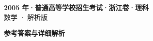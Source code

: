 \documentclass[zihao=-4, a4paper]{ctexart}
\begin{document}
\begin{center}
  {\Large\bfseries 2005 年·普通高等学校招生考试·浙江卷·理科}\\[4pt]
  {\large 数学 · 解析版}
\end{center}
\medskip
{}

\clearpage
{}
\begin{center}{\Large\bfseries 参考答案与详细解析}\end{center}
\medskip

\end{document}
